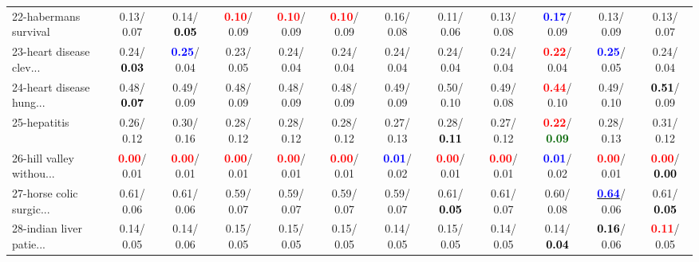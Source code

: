 \begin{table}[h]
\begin{center}
{\begin{tabular}{lc|c|c|c|c|c|c|c|c|c|c}
22-habermans survival &   0.13/  0.07 &   0.14/\textcolor{black}{\textbf{  0.05}} & \textcolor{red}{\textbf{  0.10}}/  0.09 & \textcolor{red}{\textbf{  0.10}}/  0.09 & \textcolor{red}{\textbf{  0.10}}/  0.09 &   0.16/  0.08 &   0.11/  0.06 &   0.13/  0.08 & \textcolor{blue}{\textbf{  0.17}}/  0.09 &   0.13/  0.09 &   0.13/  0.07 \\
23-heart disease clev... &   0.24/\textcolor{black}{\textbf{  0.03}} & \textcolor{blue}{\textbf{  0.25}}/  0.04 &   0.23/  0.05 &   0.24/  0.04 &   0.24/  0.04 &   0.24/  0.04 &   0.24/  0.04 &   0.24/  0.04 & \textcolor{red}{\textbf{  0.22}}/  0.04 & \textcolor{blue}{\textbf{  0.25}}/  0.05 &   0.24/  0.04 \\
24-heart disease hung... &   0.48/\textcolor{black}{\textbf{  0.07}} &   0.49/  0.09 &   0.48/  0.09 &   0.48/  0.09 &   0.48/  0.09 &   0.49/  0.09 &   0.50/  0.10 &   0.49/  0.08 & \textcolor{red}{\textbf{  0.44}}/  0.10 &   0.49/  0.10 & \textcolor{black}{\textbf{  0.51}}/  0.09 \\
25-hepatitis &   0.26/  0.12 &   0.30/  0.16 &   0.28/  0.12 &   0.28/  0.12 &   0.28/  0.12 &   0.27/  0.13 &   0.28/\textcolor{black}{\textbf{  0.11}} &   0.27/  0.12 & \textcolor{red}{\textbf{  0.22}}/\textcolor{darkgreen}{\textbf{  0.09}} &   0.28/  0.13 &   0.31/  0.12 \\
26-hill valley withou... & \textcolor{red}{\textbf{  0.00}}/  0.01 & \textcolor{red}{\textbf{  0.00}}/  0.01 & \textcolor{red}{\textbf{  0.00}}/  0.01 & \textcolor{red}{\textbf{  0.00}}/  0.01 & \textcolor{red}{\textbf{  0.00}}/  0.01 & \textcolor{blue}{\textbf{  0.01}}/  0.02 & \textcolor{red}{\textbf{  0.00}}/  0.01 & \textcolor{red}{\textbf{  0.00}}/  0.01 & \textcolor{blue}{\textbf{  0.01}}/  0.02 & \textcolor{red}{\textbf{  0.00}}/  0.01 & \textcolor{red}{\textbf{  0.00}}/\textcolor{black}{\textbf{  0.00}} \\
27-horse colic surgic... &   0.61/  0.06 &   0.61/  0.06 &   0.59/  0.07 &   0.59/  0.07 &   0.59/  0.07 &   0.59/  0.07 &   0.61/\textcolor{black}{\textbf{  0.05}} &   0.61/  0.07 &   0.60/  0.08 & \underline{\textcolor{blue}{\textbf{  0.64}}}/  0.06 &   0.61/\textcolor{black}{\textbf{  0.05}} \\
28-indian liver patie... &   0.14/  0.05 &   0.14/  0.06 &   0.15/  0.05 &   0.15/  0.05 &   0.15/  0.05 &   0.14/  0.05 &   0.15/  0.05 &   0.14/  0.05 &   0.14/\textcolor{black}{\textbf{  0.04}} & \textcolor{black}{\textbf{  0.16}}/  0.06 & \textcolor{red}{\textbf{  0.11}}/  0.05 \\ \hline

\end{tabular}}
\end{center}
\end{table}
